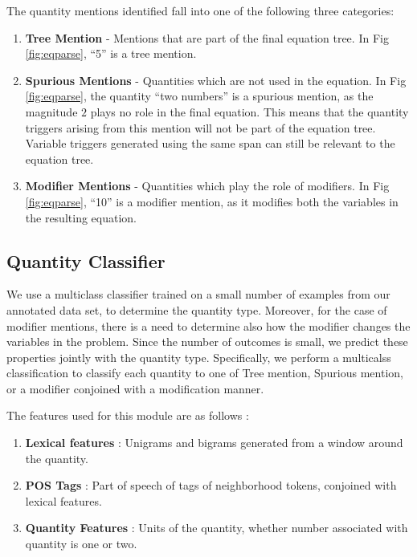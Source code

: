     The quantity mentions identified fall into one of the following
    three categories:
    \begin{enumerate}
    \item {\bf Tree Mention} - Mentions that are part of the final
      equation tree. In Fig \ref{fig:eqparse}, ``5'' is a tree
      mention.

    \item {\bf Spurious Mentions} - Quantities which are not
      used in the equation.  In Fig \ref{fig:eqparse}, the quantity
      ``two numbers'' is a spurious mention, as the magnitude $2$
      plays no role in the final equation. This means that the
      quantity triggers arising from this mention will not be part of
      the equation tree.  Variable triggers generated using the same
      span can still be relevant to the equation tree.

    \item {\bf Modifier Mentions} - Quantities which play the
      role of modifiers. In Fig \ref{fig:eqparse}, ``10'' is a
      modifier mention, as it modifies both the variables in the
      resulting equation.
    \end{enumerate}

  \subsection{Quantity Classifier}
    We use a multiclass classifier trained on a small number of
    examples from our annotated data set, to determine the quantity
    type. Moreover, for the case of modifier mentions, there is a need
    to determine also how the modifier changes the variables in the
    problem. Since the number of outcomes is small, we predict these
    properties jointly with the quantity type. Specifically, we
    perform a multicalss classification to classify each quantity to
    one of Tree mention, Spurious mention, or a modifier conjoined
    with a modification manner.

    The features used for this module are as follows : 
    \begin{enumerate}
      \item \textbf{Lexical features} : Unigrams and bigrams generated
        from a window around the quantity.
      \item \textbf{POS Tags} : Part of speech of tags of neighborhood 
        tokens, conjoined with lexical features.
      \item \textbf{Quantity Features} : Units of the quantity, whether
        number associated with quantity is one or two.
    \end{enumerate}  
    
